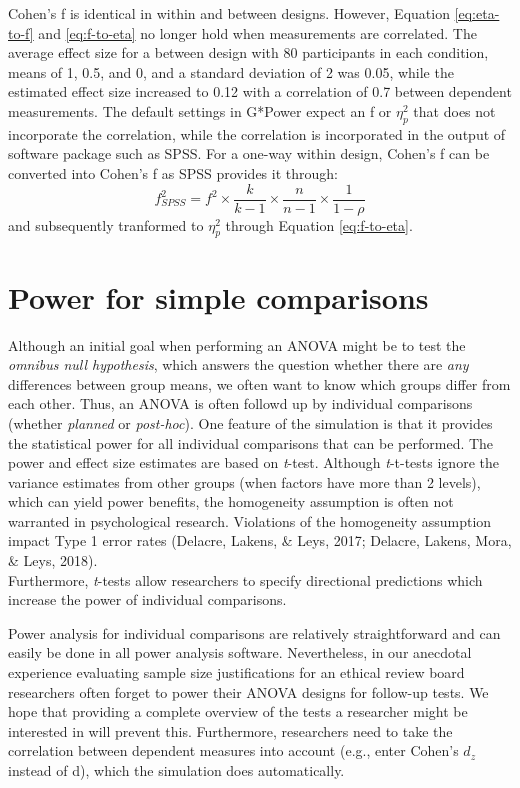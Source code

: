 \documentclass[,jou, draftfirst, a4paper,floatsintext]{apa6}
\begin{document}
Cohen's f is identical in within and between designs.
However, Equation \eqref{eq:eta-to-f} and \eqref{eq:f-to-eta} no longer hold when measurements are correlated.
The average effect size for a between design with 80 participants in each condition, means of 1, 0.5, and 0, and a standard deviation of 2 was 0.05, while the estimated effect size increased to 0.12 with a correlation of 0.7 between dependent measurements.
The default settings in G*Power expect an f or \(\eta_p^2\) that does not incorporate the correlation, while the correlation is incorporated in the output of software package such as SPSS.
For a one-way within design, Cohen's f can be converted into Cohen's f as SPSS provides it through:
\begin{equation}
f^2_{SPSS} = f^2 \times \frac{k}{k-1} \times \frac{n}{n-1} \times \frac{1}{1-\rho}
\end{equation}
and subsequently tranformed to \(\eta_p^2\) through Equation \eqref{eq:f-to-eta}.

\hypertarget{power-for-simple-comparisons}{%
\section{Power for simple comparisons}\label{power-for-simple-comparisons}}

Although an initial goal when performing an ANOVA might be to test the \emph{omnibus null hypothesis}, which answers the question whether there are \emph{any} differences between group means, we often want to know which groups differ from each other. Thus, an ANOVA is often followd up by individual comparisons (whether \emph{planned} or \emph{post-hoc}).
One feature of the simulation is that it provides the statistical power for all individual comparisons that can be performed.
The power and effect size estimates are based on \emph{t}-test.
Although \emph{t}-t-tests ignore the variance estimates from other groups (when factors have more than 2 levels), which can yield power benefits, the homogeneity assumption is often not warranted in psychological research.
Violations of the homogeneity assumption impact Type 1 error rates (Delacre, Lakens, \& Leys, 2017; Delacre, Lakens, Mora, \& Leys, 2018).\\
Furthermore, \emph{t}-tests allow researchers to specify directional predictions which increase the power of individual comparisons.

Power analysis for individual comparisons are relatively straightforward and can easily be done in all power analysis software.
Nevertheless, in our anecdotal experience evaluating sample size justifications for an ethical review board researchers often forget to power their ANOVA designs for follow-up tests.
We hope that providing a complete overview of the tests a researcher might be interested in will prevent this.
Furthermore, researchers need to take the correlation between dependent measures into account (e.g., enter Cohen's \(d_z\) instead of d), which the simulation does automatically.
\end{document}
